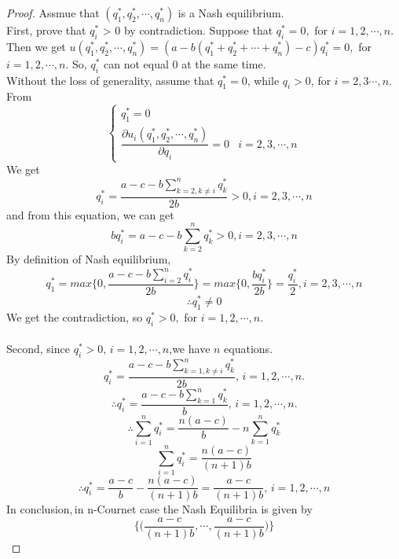 \documentclass[a4papers]{ctexart}
\begin{document}
\begin{proof}
 Assmue that $(q_1^*,q_2^*,\cdots,q_n^*)$ is a Nash equilibrium.\\
First, prove that $q_i^*$ > 0 by contradiction. Suppose that $q_i^* = 0,$ for $i=1,2,\cdots,n$.
Then we get $u(q_1^*,q_2^*,\cdots,q_n^*)=(a-b(q_1^*+q_2^*+\cdots+q_n^*)-c)q_i^* =0,$ for $i=1,2,\cdots,n$.
So, $q_i^*$ can not equal 0 at the same time.\\
Without the loss of generality, assume that $q_1^*=0$, while $q_i > 0$, for $i=2,3\cdots,n$.\\
From
\begin{equation*}
    \begin{cases}
        q_1^* = 0 \\
        \dfrac{\partial u_i(q_1^*,q_2^*,\cdots,q_n^*)}{\partial q_i} = 0 & i=2,3,\cdots,n
    \end{cases}
\end{equation*}
We get \[q_i^* = \dfrac{a-c-b\sum_{k=2,k\ne i}^{n}q_k^*}{2b} > 0,i=2,3,\cdots,n \]
and from this equation, we can get\[bq_i^* = a-c-b \sum_{k=2}^{n}q_k^* > 0,i=2,3,\cdots,n \]
By definition of Nash equilibrium, 
\[ q_1^* = max \Big\{ 0,\dfrac{a-c-b\sum_{i=2}^{n}q_i^*}{2b} \Big\} = max\Big\{ 0,\dfrac{bq_i^*}{2b}\Big\} = \dfrac{q_i^*}{2}, i=2,3,\cdots,n \]
\[\therefore q_1^* \ne 0\]
We get the contradiction, so $q_i^* > 0,$ for $i=1,2,\cdots,n.$
\\ \\ 
Second, since $q_i^* > 0,\,i=1,2,\cdots,n$,we have $n$ equations.
\[ q_i^* = \dfrac{a-c-b\sum_{k=1,k\ne i}^{n}q_k^*}{2b},\, i=1,2,\cdots,n.\]
\[ \therefore q_i^* = \dfrac{a-c-b\sum_{k=1}^{n}q_k^*}{b},\, i=1,2,\cdots,n.\]
\[ \therefore \sum_{i=1}^{n} q_i^*= \dfrac{n(a-c)}{b} - n\sum_{k=1}^{n}q_k^* \]
\[ \sum_{i=1}^{n} q_i^* = \dfrac{n(a-c)}{(n+1)b}\]
\[ \therefore q_i^* = \dfrac{a-c}{b}-\dfrac{n(a-c)}{(n+1)b}=\dfrac{a-c}{(n+1)b},\,i=1,2,\cdots,n  \]
In conclusion,\,in n-Cournet case the Nash Equilibria is given by
\[ \Big\{ \Big(\dfrac{a-c}{(n+1)b},\cdots,\dfrac{a-c}{(n+1)b}  \Big) \Big\} \]
\end{proof}
\end{document}
